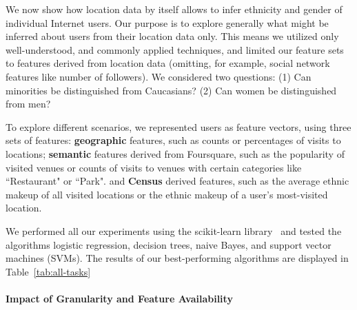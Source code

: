 
We now show how location data by itself allows to infer ethnicity and gender of individual Internet users.
Our purpose is to explore generally what might be inferred about users from their location data only.
This means we utilized only well-understood, and commonly applied techniques, and limited our feature sets to features derived from location data (omitting, for example, social network features like number of followers).
We considered two questions: (1) Can minorities be distinguished from Caucasians? (2) Can women be distinguished from men?

To explore different scenarios, we represented users as feature vectors, using three sets of features:
\textbf{geographic} features, such as counts or percentages of visits to locations; 
\textbf{semantic} features derived from Foursquare, such as the popularity of visited venues or counts of visits to venues with certain categories like ``Restaurant" or ``Park".
and \textbf{Census} derived features, such as the average ethnic makeup of all visited locations or the ethnic makeup of a user's most-visited location.

We performed all our experiments using the scikit-learn library~\cite{scikit-learn} and tested the algorithms logistic regression, decision trees, naive Bayes, and support vector machines (SVMs). 
The results of our best-performing algorithms are displayed in Table~\ref{tab:all-tasks}


\paragraph{Impact of Granularity and Feature Availability}

